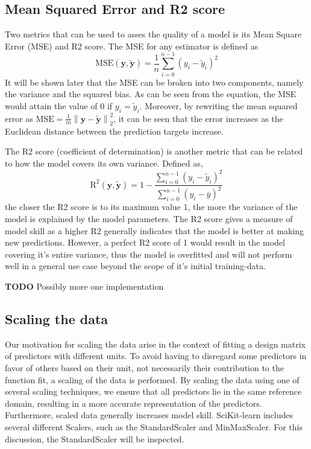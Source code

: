 \documentclass[11pt, a4paper]{article}
\begin{document}
\subsection*{Mean Squared Error and R2 score}
Two metrics that can be used to asses the quality of a model is its Mean Square Error (MSE) and R2 score. The MSE for any estimator is defined as 
\[
  \text{MSE}(\boldsymbol{y},\boldsymbol{\tilde{y}}) = \frac{1}{n}
  \sum_{i=0}^{n-1}(y_i-\tilde{y}_i)^2
\]
It will be shown later that the MSE can be broken into two components, namely the variance and the squared bias. As can be seen from the equation, the MSE would attain the value of 0 if $y_i = \tilde{y}_i$. Moreover, by rewriting the mean squared error as $\text{MSE} = \frac{1}{m}\left\lVert \bm{y} - \bm{\tilde{y}}\right\rVert_2^2$, it can be seen that the error increases as the Euclidean distance between the prediction targets increase. \cite{Goodfellow2016}

The R2 score (coefficient of determination) is another metric that can be related to how the model covers its own variance. Defined as, 
\[
  \text{R}^2(\boldsymbol{y}, \tilde{\boldsymbol{y}}) = 1 - \frac{\sum_{i=0}^{n - 1} (y_i - \tilde{y}_i)^2}{\sum_{i=0}^{n - 1} (y_i - \bar{y})^2}
\] the closer the R2 score is to its maximum value 1, the more the variance of the model is explained by the model parameters. The R2 score gives a measure of model skill as a higher R2 generally indicates that the model is better at making new predictions. However, a perfect R2 score of 1 would result in the model covering it's entire variance, thus the model is overfitted and will not perform well in a general use case beyond the scope of it's initial training-data.

\textbf{TODO} Possibly more one implementation

\subsection*{Scaling the data}
Our motivation for scaling the data arise in the context of fitting a design matrix of predictors with different units. To avoid having to disregard some predictors in favor of others based on their unit, not necessarily their contribution to the function fit, a scaling of the data is performed. By scaling the data using one of several scaling techniques, we ensure that all predictors lie in the same reference domain, resulting in a more accurate representation of the predictors. Furthermore, scaled data generally increases model skill. SciKit-learn includes several different Scalers, such as the StandardScaler and MinMaxScaler. \cite{scikit-learn} For this discussion, the StandardScaler will be inspected.
\end{document}
